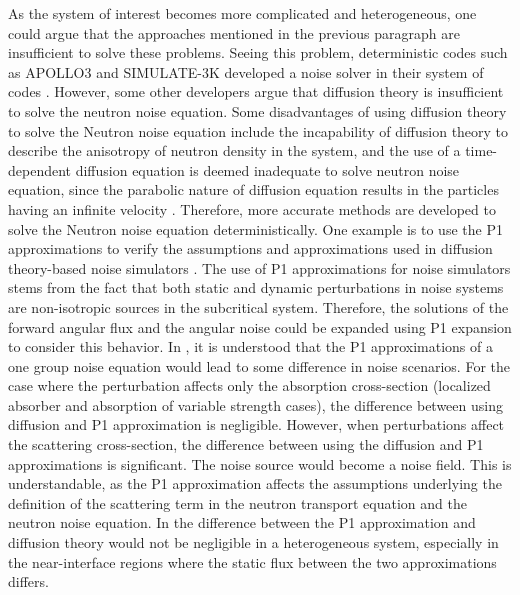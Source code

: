 As the system of interest becomes more complicated and heterogeneous, one could argue that the approaches mentioned in the previous paragraph are insufficient to solve these problems. Seeing this problem, deterministic codes such as APOLLO3 and SIMULATE-3K developed a noise solver in their system of codes \cite{chionisSIMULATE3KAnalysesNeutron2017, rouchonNew3DMultigroup2017}. However, some other developers argue that diffusion theory is insufficient to solve the neutron noise equation. Some disadvantages of using diffusion theory to solve the Neutron noise equation include the incapability of diffusion theory to describe the anisotropy of neutron density in the system, and the use of a time-dependent diffusion equation is deemed inadequate to solve neutron noise equation, since the parabolic nature of diffusion equation results in the particles having an infinite velocity \cite{bellNuclearReactorTheory1970, bahramiSNTransportMethod2018}. Therefore, more accurate methods are developed to solve the Neutron noise equation deterministically. One example is to use the P1 approximations to verify the assumptions and approximations used in diffusion theory-based noise simulators \cite{pazsitNeutronNoiseTheory2002, larssonComparativeStudy2group2009}. The use of P1 approximations for noise simulators stems from the fact that both static and dynamic perturbations in noise systems are non-isotropic sources in the subcritical system. Therefore, the solutions of the forward angular flux and the angular noise could be expanded using P1 expansion to consider this behavior. In \cite{pazsitNeutronNoiseTheory2002}, it is understood that the P1 approximations of a one group noise equation would lead to some difference in noise scenarios. For the case where the perturbation affects only the absorption cross-section (localized absorber and absorption of variable strength cases), the difference between using diffusion and P1 approximation is negligible. However, when perturbations affect the scattering cross-section, the difference between using the diffusion and P1 approximations is significant. The noise source would become a noise field. This is understandable, as the P1 approximation affects the assumptions underlying the definition of the scattering term in the neutron transport equation and the neutron noise equation. In \cite{larssonComparativeStudy2group2009} the difference between the P1 approximation and diffusion theory would not be negligible in a heterogeneous system, especially in the near-interface regions where the static flux between the two approximations differs.


